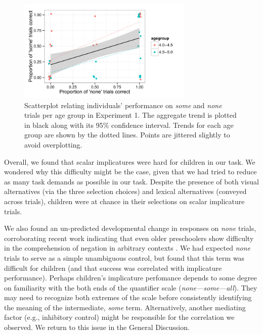 \documentclass[10pt,letterpaper]{article}
\begin{document}
\begin{figure}[h] 
  \begin{center} 
    \includegraphics[width=3.3in]{figures/implicatures_adhocScalar_scatterplot.pdf} 
    \caption{\label{fig:expt1scatterplot} Scatterplot relating individuals' performance on \emph{some} and \emph{none} trials per age group in Experiment 1. The aggregate trend is plotted in black along with its 95\% confidence interval. Trends for each age group are shown by the dotted lines. Points are jittered slightly to avoid overplotting.}
    \end{center} 
\end{figure}


Overall, we found that scalar implicatures were hard for children in our task. We wondered why this difficulty might be the case, given that we had tried to reduce as many task demands as possible in our task. Despite the presence of both visual alternatives (via the three selection choices) and lexical alternatives (conveyed across trials), children were at chance in their selections on scalar implicature trials. 

We also found an un-predicted developmental change in responses on \emph{none} trials, corroborating recent work indicating that even older preschoolers show difficulty in the comprehension of negation in arbitrary contexts \cite{nordmeyer2014}. We had expected \emph{none} trials to serve as a simple unambiguous control, but found that this term was difficult for children (and that success was correlated with implicature performance). Perhaps children's implicature perfomance depends to some degree on familiarity with the both ends of the quantifier scale (\emph{none---some---all}). They may need to recognize both extremes of the scale before consistently identifying the meaning of the intermediate, \emph{some} term. Alternatively, another mediating factor (e.g., inhibitory control) might be responsible for the correlation we observed. We return to this issue in the General Discussion.
\end{document}
